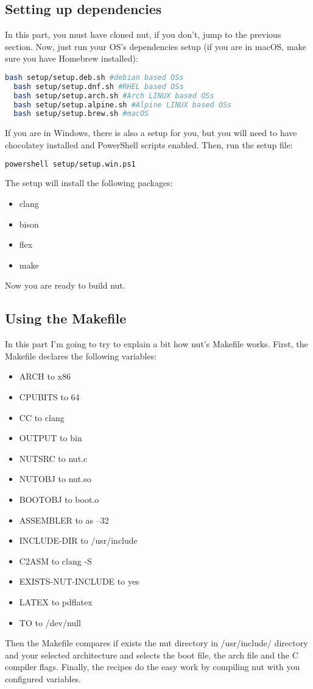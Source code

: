 \documentclass{article}
\begin{document}
  \subsection{Setting up dependencies}
  In this part, you must have cloned nut, if you don't, jump to the previous section. Now, just run your OS's dependencies setup (if you are in macOS, make sure you have Homebrew installed):
  \begin{lstlisting}[language=bash]
  bash setup/setup.deb.sh #debian based OSs
  bash setup/setup.dnf.sh #RHEL based OSs
  bash setup/setup.arch.sh #Arch LINUX based OSs
  bash setup/setup.alpine.sh #Alpine LINUX based OSs
  bash setup/setup.brew.sh #macOS\end{lstlisting}
  If you are in Windows, there is also a setup for you, but you will need to have chocolatey installed and PowerShell scripts enabled. Then, run the setup file:
  \begin{lstlisting}[language=bash]
  powershell setup/setup.win.ps1\end{lstlisting}
  The setup will install the following packages:
  \begin{itemize}
  	\item clang
  	\item bison
  	\item flex
  	\item make
  \end{itemize}
  Now you are ready to build nut.
  \\
  \subsection{Using the Makefile}
  In this part I'm going to try to explain a bit how nut's Makefile works. First, the Makefile declares the following variables:
  \begin{itemize}
  	\item ARCH to x86
  	\item CPUBITS to 64
  	\item CC to clang
  	\item OUTPUT to bin
  	\item NUTSRC to nut.c
  	\item NUTOBJ to nut.so
  	\item BOOTOBJ to boot.o
  	\item ASSEMBLER to as --32
  	\item INCLUDE-DIR to /usr/include
  	\item C2ASM to clang -S
  	\item EXISTS-NUT-INCLUDE to yes
  	\item LATEX to pdflatex
  	\item TO to /dev/null
  \end{itemize}
  Then the Makefile compares if exists the nut directory in /usr/include/ directory and your selected architecture and selects the boot file, the arch file and the C compiler flags. Finally, the recipes do the easy work by compiling nut with you configured variables.
\end{document}
